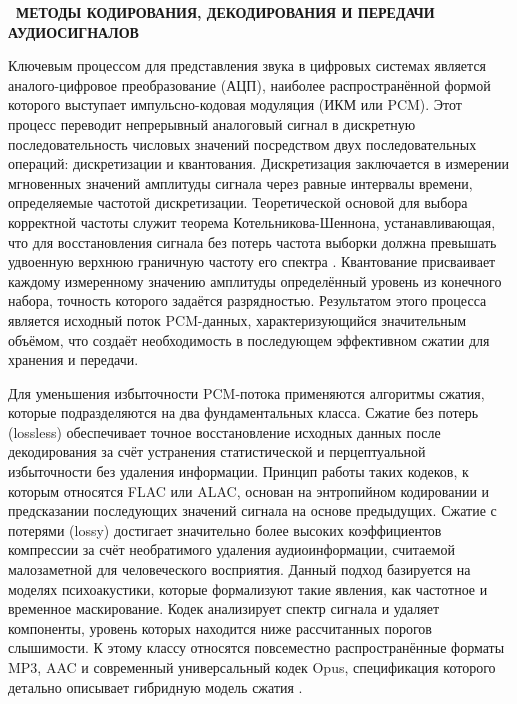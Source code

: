 \documentclass{SibFU-docs}
\begin{document}
\newpage
{}
\begin{center}\textbf{\thesection\ МЕТОДЫ КОДИРОВАНИЯ, ДЕКОДИРОВАНИЯ И ПЕРЕДАЧИ АУДИОСИГНАЛОВ}\end{center}
\vspace*{-1.5em}

Ключевым процессом для представления звука в цифровых системах является аналого-цифровое преобразование (АЦП), наиболее распространённой формой которого выступает импульсно-кодовая модуляция (ИКМ или PCM). Этот процесс переводит непрерывный аналоговый сигнал в дискретную последовательность числовых значений посредством двух последовательных операций: дискретизации и квантования. Дискретизация заключается в измерении мгновенных значений амплитуды сигнала через равные интервалы времени, определяемые частотой дискретизации. Теоретической основой для выбора корректной частоты служит теорема Котельникова-Шеннона, устанавливающая, что для восстановления сигнала без потерь частота выборки должна превышать удвоенную верхнюю граничную частоту его спектра \cite{shannon1948mathematical}. Квантование присваивает каждому измеренному значению амплитуды определённый уровень из конечного набора, точность которого задаётся разрядностью. Результатом этого процесса является исходный поток PCM-данных, характеризующийся значительным объёмом, что создаёт необходимость в последующем эффективном сжатии для хранения и передачи.


Для уменьшения избыточности PCM-потока применяются алгоритмы сжатия, которые подразделяются на два фундаментальных класса. Сжатие без потерь (lossless) обеспечивает точное восстановление исходных данных после декодирования за счёт устранения статистической и перцептуальной избыточности без удаления информации. Принцип работы таких кодеков, к которым относятся FLAC или ALAC, основан на энтропийном кодировании и предсказании последующих значений сигнала на основе предыдущих. Сжатие с потерями (lossy) достигает значительно более высоких коэффициентов компрессии за счёт необратимого удаления аудиоинформации, считаемой малозаметной для человеческого восприятия. Данный подход базируется на моделях психоакустики, которые формализуют такие явления, как частотное и временное маскирование. Кодек анализирует спектр сигнала и удаляет компоненты, уровень которых находится ниже рассчитанных порогов слышимости. К этому классу относятся повсеместно распространённые форматы MP3, AAC и современный универсальный кодек Opus, спецификация которого детально описывает гибридную модель сжатия \cite{opus2024}.
\end{document}
